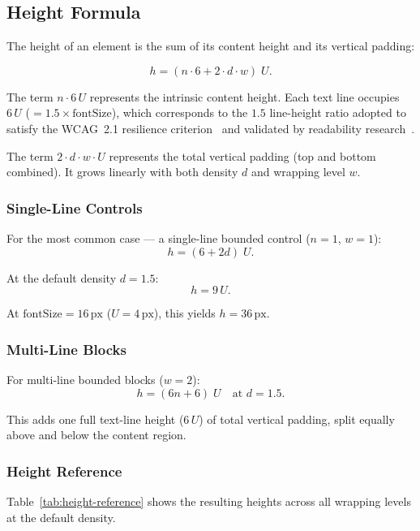 \subsection{Height Formula}
\label{sec:height}

The height of an element is the sum of its content height and its vertical padding:

\begin{equation}
\label{eq:height}
h = (n \cdot 6 + 2 \cdot d \cdot w) \; U.
\end{equation}

The term $n \cdot 6\,U$ represents the intrinsic content height. Each text line occupies $6\,U$ ($= 1.5 \times \text{fontSize}$), which corresponds to the $1.5$ line-height ratio adopted to satisfy the WCAG~2.1 resilience criterion~\cite{wcag21text} and validated by readability research~\cite{rello2016}.

The term $2 \cdot d \cdot w \cdot U$ represents the total vertical padding (top and bottom combined). It grows linearly with both density $d$ and wrapping level $w$.

\subsubsection{Single-Line Controls}

For the most common case --- a single-line bounded control ($n = 1$, $w = 1$):
\begin{equation}
h = (6 + 2d) \; U.
\end{equation}

At the default density $d = 1.5$:
\begin{equation}
h = 9\,U.
\end{equation}

At $\text{fontSize} = 16\,\text{px}$ ($U = 4\,\text{px}$), this yields $h = 36\,\text{px}$.

\subsubsection{Multi-Line Blocks}

For multi-line bounded blocks ($w = 2$):
\begin{equation}
h = (6n + 6) \; U \quad \text{at } d = 1.5.
\end{equation}

This adds one full text-line height ($6\,U$) of total vertical padding, split equally above and below the content region.

\subsubsection{Height Reference}

Table~\ref{tab:height-reference} shows the resulting heights across all wrapping levels at the default density.


